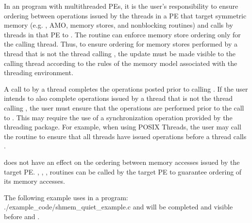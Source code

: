 \begin{apidefinition}
{    In an \openshmem program with multithreaded \acp{PE}, it is the
    user's responsibility to ensure ordering between operations issued by the threads
    in a \ac{PE} that target symmetric memory (e.g. \PUT{}, \ac{AMO}, memory stores,
    and nonblocking routines) and calls by threads in that \ac{PE} to
    . The  routine can enforce memory store ordering only for the
    calling thread. Thus, to ensure ordering for memory stores performed by a thread that is
    not the thread calling , the update must be made visible to the
    calling thread according to the rules of the memory model associated with
    the threading environment.

     A call to  by a thread completes the operations posted prior
     to calling . If the user intends to also complete operations
     issued by a thread that is not the thread calling , the
     user must ensure that the operations are performed prior to the call to
     . This may require the use of a synchronization
     operation provided by the threading package. For example, when using POSIX
     Threads, the user may call the  routine to
     ensure that all threads have issued operations before a thread calls
     .

     does not have an effect on the ordering between memory
    accesses issued by the target PE. ,
    , ,  routines
    can be called by the target PE to guarantee ordering of its memory accesses.
}

\begin{apiexamples}

\apicexample
    {The following example uses  in a \Cstd[11] program: }
    {./example_code/shmem_quiet_example.c}
    { and  will be completed and visible before 
    and .}
\end{apiexamples}

\end{apidefinition}
